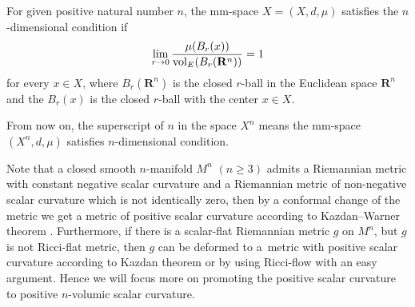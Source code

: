 \documentclass[10pt,a4paper]{amsart}
\begin{document}
\begin{Definition}
For given positive natural number $n$, the mm-space $X=(X, d, \mu)$ satisfies the $n$-dimensional condition if
\begin{align*}
 \lim\limits_{r \to 0}\frac{\mu(B_r(x))}{{\rm vol}_E(B_r(\mathbf{R}^n))}=1
\end{align*}
 for every $x \in X$, where $B_r(\mathbf{R}^n)$ is the closed $r$-ball in the Euclidean space $\mathbf{R}^n$ and the $B_r(x)$ is the closed $r$-ball with the center $x\in X$.
\end{Definition}

 From now on, the superscript of $n$ in the space $X^n$ means the mm-space $(X^n, d, \mu)$ satisfies $n$-dimensional condition.

 Note that a closed smooth $n$-manifold $M^n$ $(n\geq 3)$ admits a Riemannian metric with constant negative scalar curvature and a Riemannian metric of non-negative scalar curvature which is not identically zero, then by a conformal change of the metric we get a metric of positive scalar curvature according to Kazdan--Warner theorem \cite{MR365409}. Furthermore, if there is a scalar-flat Riemannian metric $g$ on $M^n$, but $g$ is not Ricci-flat metric, then $g$ can be deformed to a~metric with positive scalar curvature according to Kazdan theorem \cite[Theorem~B]{MR675736} or by using Ricci-flow with an easy argument. Hence we will focus more on promoting the positive scalar curvature to positive $n$-volumic scalar curvature.
\end{document}
